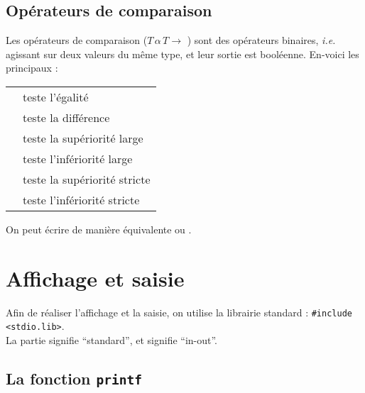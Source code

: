 	\subsection{Opérateurs de comparaison}
		Les opérateurs de comparaison (\(T \,\alpha\, T \rightarrow\) ) sont des opérateurs binaires, \emph{i.e.} agissant sur deux valeurs du même type, et leur sortie est booléenne. En-voici les principaux :
			\begin{center}
				\begin{tabular}[h]{r|l}
					\cc{==} & teste l'égalité \\
					\cc{!=} & teste la différence \\
					\cc{>=} & teste la supériorité large \\
					\cc{<=} & teste l'infériorité large \\
					\cc{>} & teste la supériorité stricte \\
					\cc{<} & teste l'infériorité stricte
				\end{tabular}
			\end{center}
		
		\begin{Remarque}
			On peut écrire de manière équivalente  ou .
		\end{Remarque}
	
\section{Affichage et saisie}

	Afin de réaliser l'affichage et la saisie, on utilise la librairie standard : \texttt{#include <stdio.lib>}. \\
	La partie  signifie ``standard'', et  signifie ``in-out''.
	
	\subsection{La fonction \texttt{printf}}
	
